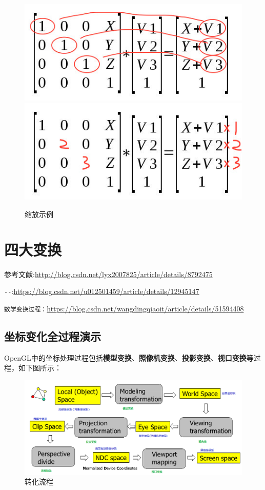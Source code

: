 \documentclass[UTF8,a4paper,12pt]{ctexbook}
\begin{document}
		\begin{figure}[h]
			\centering
			\includegraphics[scale = 0.57]{scale_1.png}
			\includegraphics[scale = 0.57]{scale_2.png}
			\caption{缩放示例}
		\end{figure}

\chapter{四大变换}
参考文献:\url{http://blog.csdn.net/lyx2007825/article/details/8792475}

\verb|--|:\url{https://blog.csdn.net/u012501459/article/details/12945147}

\verb|数学变换过程：|\url{https://blog.csdn.net/wangdingqiaoit/article/details/51594408}

	\section{坐标变化全过程演示}
		OpenGL中的坐标处理过程包括\textbf{模型变换}、\textbf{照像机变换}、\textbf{投影变换}、\textbf{视口变换}等过程，如下图所示：
		
		\begin{figure}[htbp]
			\centering
			\includegraphics[scale = 0.57]{transferAll.png}
			\caption{转化流程}
		\end{figure}
		
\end{document}
